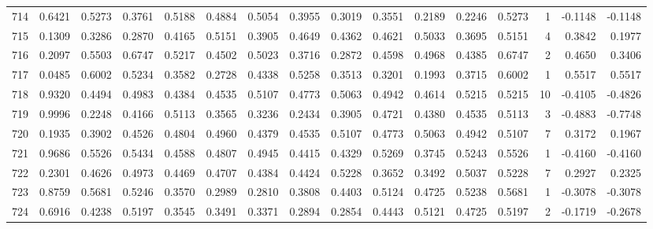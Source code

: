 \begin{tabular}{lrrrrrrrrrrrrrrr}
714 &      0.6421 &  0.5273 &  0.3761 &  0.5188 &  0.4884 &  0.5054 &  0.3955 &  0.3019 &  0.3551 &  0.2189 &   0.2246 &     0.5273 &      1 &                   -0.1148 &                    -0.1148 \\
715 &      0.1309 &  0.3286 &  0.2870 &  0.4165 &  0.5151 &  0.3905 &  0.4649 &  0.4362 &  0.4621 &  0.5033 &   0.3695 &     0.5151 &      4 &                    0.3842 &                     0.1977 \\
716 &      0.2097 &  0.5503 &  0.6747 &  0.5217 &  0.4502 &  0.5023 &  0.3716 &  0.2872 &  0.4598 &  0.4968 &   0.4385 &     0.6747 &      2 &                    0.4650 &                     0.3406 \\
717 &      0.0485 &  0.6002 &  0.5234 &  0.3582 &  0.2728 &  0.4338 &  0.5258 &  0.3513 &  0.3201 &  0.1993 &   0.3715 &     0.6002 &      1 &                    0.5517 &                     0.5517 \\
718 &      0.9320 &  0.4494 &  0.4983 &  0.4384 &  0.4535 &  0.5107 &  0.4773 &  0.5063 &  0.4942 &  0.4614 &   0.5215 &     0.5215 &     10 &                   -0.4105 &                    -0.4826 \\
719 &      0.9996 &  0.2248 &  0.4166 &  0.5113 &  0.3565 &  0.3236 &  0.2434 &  0.3905 &  0.4721 &  0.4380 &   0.4535 &     0.5113 &      3 &                   -0.4883 &                    -0.7748 \\
720 &      0.1935 &  0.3902 &  0.4526 &  0.4804 &  0.4960 &  0.4379 &  0.4535 &  0.5107 &  0.4773 &  0.5063 &   0.4942 &     0.5107 &      7 &                    0.3172 &                     0.1967 \\
721 &      0.9686 &  0.5526 &  0.5434 &  0.4588 &  0.4807 &  0.4945 &  0.4415 &  0.4329 &  0.5269 &  0.3745 &   0.5243 &     0.5526 &      1 &                   -0.4160 &                    -0.4160 \\
722 &      0.2301 &  0.4626 &  0.4973 &  0.4469 &  0.4707 &  0.4384 &  0.4424 &  0.5228 &  0.3652 &  0.3492 &   0.5037 &     0.5228 &      7 &                    0.2927 &                     0.2325 \\
723 &      0.8759 &  0.5681 &  0.5246 &  0.3570 &  0.2989 &  0.2810 &  0.3808 &  0.4403 &  0.5124 &  0.4725 &   0.5238 &     0.5681 &      1 &                   -0.3078 &                    -0.3078 \\
724 &      0.6916 &  0.4238 &  0.5197 &  0.3545 &  0.3491 &  0.3371 &  0.2894 &  0.2854 &  0.4443 &  0.5121 &   0.4725 &     0.5197 &      2 &                   -0.1719 &                    -0.2678 \\

\end{tabular}
